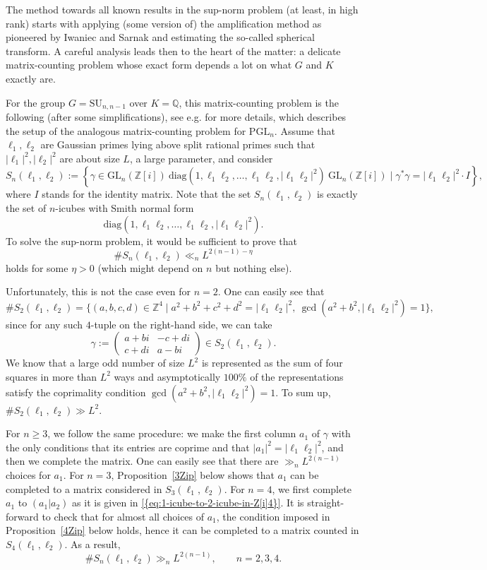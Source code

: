 \documentclass[11pt]{amsart}
\newcommand{\diag}{\mathrm{diag}}
\newcommand{\ZZ}{\mathbb{Z}}
\newcommand{\QQ}{\mathbb{Q}}
\theoremstyle{definition}
\theoremstyle{remark}
\begin{document}
The method towards all known results in the sup-norm problem (at least, in high rank) starts with applying (some version of) the amplification method as pioneered by Iwaniec and Sarnak \cite{IwaniecSarnak} and estimating the so-called spherical transform. A careful analysis leads then to the heart of the matter: a delicate matrix-counting problem whose exact form depends a lot on what $G$ and $K$ exactly are.

For the group $G=\mathrm{SU}_{n,n-1}$ over $K=\QQ$, this matrix-counting problem is the following (after some simplifications), see e.g. \cite{BlomerMagaIMRN} for more details, which describes the setup of the analogous matrix-counting problem for $\mathrm{PGL}_n$. Assume that $\ell_1,\ell_2$ are Gaussian primes lying above split rational primes such that $|\ell_1|^2,|\ell_2|^2$ are about size $L$, a large parameter, and consider
\[
S_n(\ell_1,\ell_2):=\left\{\gamma\in \mathrm{GL}_n(\ZZ[i])\ \diag(1,\ell_1\ell_2,\dotsc,\ell_1\ell_2,|\ell_1\ell_2|^2)\ \mathrm{GL}_n(\ZZ[i]) \mid \gamma^* \gamma= |\ell_1\ell_2|^2 \cdot I \right\},
\]
where $I$ stands for the identity matrix.
Note that the set $S_n(\ell_1,\ell_2)$ is exactly the set of $n$-icubes with Smith normal form \[\diag(1,\ell_1\ell_2,\dots,\ell_1\ell_2,|\ell_1\ell_2|^2).\] To solve the sup-norm problem, it would be sufficient to prove that
\[
\# S_n(\ell_1,\ell_2) \ll_n L^{2(n-1)-\eta}
\]
holds for some $\eta>0$ (which might depend on $n$ but nothing else).

Unfortunately, this is not the case even for $n=2$. One can easily see that
\[
\# S_2(\ell_1,\ell_2) = \{(a,b,c,d) \in \ZZ^4 \mid a^2+b^2+c^2+d^2=|\ell_1\ell_2|^2,\ \gcd(a^2+b^2,|\ell_1\ell_2|^2)=1 \},
\]
since for any such $4$-tuple on the right-hand side, we can take
\begin{equation}\label{eq:special-hecke-returns}
\gamma:=\begin{pmatrix}
a+bi & -c+di \\ c+di & a-bi
\end{pmatrix}\in S_2(\ell_1,\ell_2).
\end{equation}
We know that a large odd number of size $L^2$ is represented as the sum of four squares in more than $L^2$ ways and asymptotically $100\%$ of the representations satisfy the coprimality condition $\gcd(a^2+b^2,|\ell_1\ell_2|^2)=1$. To sum up, $\#S_2(\ell_1,\ell_2)\gg L^2$.

For $n\geq 3$, we follow the same procedure: we make the first column $a_1$ of $\gamma$ with the only conditions that its entries are coprime and that $|a_1|^2=|\ell_1\ell_2|^2$, and then we complete the matrix. One can easily see that there are $\gg_n L^{2(n-1)}$ choices for $a_1$. For $n=3$, Proposition~\ref{3Zip} below shows that $a_1$ can be completed to a matrix considered in $S_3(\ell_1,\ell_2)$. For $n=4$, we first complete $a_1$ to $(a_1|a_2)$ as it is given in \eqref{{eq:1-icube-to-2-icube-in-Z[i]4}}. It is straight-forward to check that for almost all choices of $a_1$, the condition imposed in Proposition~\ref{4Zip} below holds, hence it can be completed to a matrix counted in $S_4(\ell_1,\ell_2)$. As a result,
\[
\#S_n(\ell_1,\ell_2)\gg_n L^{2(n-1)},\qquad n=2,3,4.
\]
\end{document}
